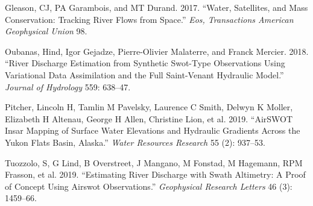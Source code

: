 \documentclass[]{book}
\begin{document}
\leavevmode\hypertarget{ref-gleason2017}{}%
Gleason, CJ, PA Garambois, and MT Durand. 2017. ``Water, Satellites, and Mass Conservation: Tracking River Flows from Space.'' \emph{Eos, Transactions American Geophysical Union} 98.

\leavevmode\hypertarget{ref-oubanas2018}{}%
Oubanas, Hind, Igor Gejadze, Pierre-Olivier Malaterre, and Franck Mercier. 2018. ``River Discharge Estimation from Synthetic Swot-Type Observations Using Variational Data Assimilation and the Full Saint-Venant Hydraulic Model.'' \emph{Journal of Hydrology} 559: 638--47.

\leavevmode\hypertarget{ref-pitcher2019}{}%
Pitcher, Lincoln H, Tamlin M Pavelsky, Laurence C Smith, Delwyn K Moller, Elizabeth H Altenau, George H Allen, Christine Lion, et al. 2019. ``AirSWOT Insar Mapping of Surface Water Elevations and Hydraulic Gradients Across the Yukon Flats Basin, Alaska.'' \emph{Water Resources Research} 55 (2): 937--53.

\leavevmode\hypertarget{ref-tuozzolo2019}{}%
Tuozzolo, S, G Lind, B Overstreet, J Mangano, M Fonstad, M Hagemann, RPM Frasson, et al. 2019. ``Estimating River Discharge with Swath Altimetry: A Proof of Concept Using Airswot Observations.'' \emph{Geophysical Research Letters} 46 (3): 1459--66.
\end{document}
